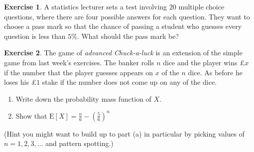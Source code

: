 \documentclass[
]{book}
\theoremstyle{definition}
\theoremstyle{definition}
\theoremstyle{definition}
\newtheorem{exercise}{Exercise}[chapter]
\theoremstyle{definition}
\theoremstyle{remark}
\begin{document}
\begin{exercise}
A statistics lecturer sets a test involving \(20\) multiple choice questions, where there are four possible answers for each question. They want to choose a pass mark so that the chance of passing a student who guesses every question is less than \(5\%\). What should the pass mark be?
\end{exercise}

\begin{exercise}
The game of \emph{advanced Chuck-a-luck} is an extension of the simple game from last week's exercises. The banker rolls \(n\) dice and the player wins £\(x\) if the number that the player guesses appears on \(x\) of the \(n\) dice. As before he loses his £\(1\) stake if the number does not come up on any of the dice.

\begin{enumerate}
\def\labelenumi{\alph{enumi})}
\item
  Write down the probability mass function of \(X\).
\item
  Show that \(\text{E}[X] = \frac{n}{6} - \left(\frac{5}{6}\right)^n\)
\end{enumerate}

(Hint you might want to build up to part (a) in particular by picking values of \(n=1,2,3,\dots\) and pattern spotting.)
\end{exercise}
\end{document}
